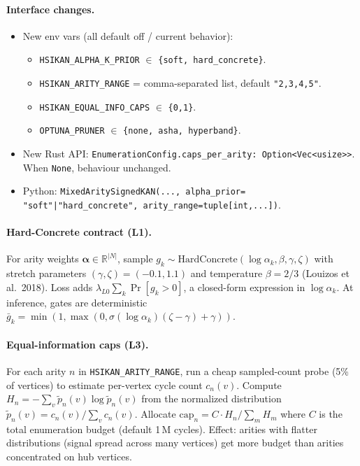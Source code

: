 \documentclass{article}
\begin{document}
\paragraph{Interface changes.}
\begin{itemize}
  \item New env vars (all default off / current behavior):
    \begin{itemize}
      \item \texttt{HSIKAN\_ALPHA\_K\_PRIOR} $\in$ \texttt{\{soft, hard\_concrete\}}.
      \item \texttt{HSIKAN\_ARITY\_RANGE} = comma-separated list,
      default \texttt{"2,3,4,5"}.
      \item \texttt{HSIKAN\_EQUAL\_INFO\_CAPS} $\in$ \texttt{\{0,1\}}.
      \item \texttt{OPTUNA\_PRUNER} $\in$ \texttt{\{none, asha, hyperband\}}.
    \end{itemize}
  \item New Rust API: \texttt{EnumerationConfig.caps\_per\_arity:
    Option<Vec<usize>>}.  When \texttt{None}, behaviour unchanged.
  \item Python: \texttt{MixedAritySignedKAN(..., alpha\_prior=
    "soft"|"hard\_concrete", arity\_range=tuple[int,...])}.
\end{itemize}

\paragraph{Hard-Concrete contract (L1).}
For arity weights $\boldsymbol{\alpha} \in \mathbb{R}^{|N|}$, sample
$g_k \sim \mathrm{HardConcrete}(\log\alpha_k, \beta, \gamma, \zeta)$
with stretch parameters $(\gamma, \zeta) = (-0.1, 1.1)$ and temperature
$\beta = 2/3$ (Louizos et al.\ 2018).  Loss adds
$\lambda_{L0} \sum_k \Pr[g_k > 0]$, a closed-form expression in
$\log\alpha_k$.  At inference, gates are deterministic
$\bar g_k = \min(1, \max(0, \sigma(\log\alpha_k)(\zeta-\gamma) + \gamma))$.

\paragraph{Equal-information caps (L3).}
For each arity $n$ in \texttt{HSIKAN\_ARITY\_RANGE}, run a cheap
sampled-count probe (5\% of vertices) to estimate per-vertex cycle
count $c_n(v)$.  Compute
$H_n = -\sum_v \tilde p_n(v) \log \tilde p_n(v)$ from the normalized
distribution $\tilde p_n(v) = c_n(v) / \sum_v c_n(v)$.
Allocate $\mathrm{cap}_n = C \cdot H_n / \sum_m H_m$ where $C$ is the
total enumeration budget (default 1\,M cycles).  Effect: arities with
flatter distributions (signal spread across many vertices) get more
budget than arities concentrated on hub vertices.
\end{document}

